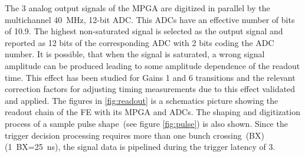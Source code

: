 The 3 analog output signals of the MPGA are digitized in parallel by the multichannel 40~MHz, 12-bit ADC. This ADCs have an effective number of bits of 10.9. The highest non-saturated signal is selected as the output signal and reported as 12 bits of the corresponding ADC with 2 bits coding the ADC number. It is possible, that when the signal is saturated, a wrong signal amplitude can be produced leading to some amplitude dependence of the readout time. This effect has been studied for Gains 1 and 6 transitions and the relevant correction factors for adjusting timing measurements due to this effect validated and applied.
The figures in \ref{fig:readout} is a schematics picture showing the readout chain of the FE with its MPGA and ADCs. The shaping and digitization process of a sample pulse shape~(see figure \ref{fig:pulse}) is also shown. Since the trigger decision processing requires more than one bunch crossing~(BX)(1~BX=25~ns), the signal data is pipelined during the trigger latency of 3\mus.


